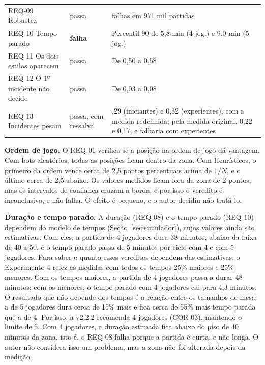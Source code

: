\begin{table}[ht]
\begin{tabularx}{\linewidth}{>{\raggedright\arraybackslash}p{3.2cm} >{\raggedright\arraybackslash}p{2.5cm} >{\raggedright\arraybackslash}X}
    REQ-09 Robustez & passa & 0 falhas em 971 mil partidas \\
    REQ-10 Tempo parado & \textbf{falha} & Percentil 90 de 5,8 min (4 jog.) e 9,0 min (5 jog.) \\
    REQ-11 Os dois estilos aparecem & passa & De 0,50 a 0,58 \\
    REQ-12 O 1º incidente não decide & passa & De 0,03 a 0,08 \\
    REQ-13 Incidentes pesam & passa, com ressalva & 0,29 (iniciantes) e 0,32 (experientes), com a medida redefinida; pela medida original, 0,22 e 0,17, e falharia com experientes \\
    \bottomrule
  \end{tabularx}
\end{table}

\textbf{Ordem de jogo.} O REQ-01 verifica se a posição na ordem de jogo dá vantagem. Com bots aleatórios, todas as
posições ficam dentro da zona. Com Heurísticos, o primeiro da ordem vence cerca de 2,5 pontos percentuais acima de
$1/N$, e o último cerca de 2,5 abaixo. Os valores medidos ficam fora da zona de 2 pontos, mas os
intervalos de confiança cruzam a borda, e por isso o veredito é inconclusivo, e não falha. O efeito é pequeno, e
o autor decidiu não tratá-lo.

\textbf{Duração e tempo parado.} A duração (REQ-08) e o tempo parado (REQ-10) dependem do modelo de tempos
(Seção~\ref{sec:simulador}), cujos valores ainda são estimativas. Com eles, a partida de 4 jogadores dura 38
minutos, abaixo da faixa de 40 a 50, e o tempo parado passa de 5 minutos por ciclo com 4 e com 5 jogadores. Para
saber o quanto esses vereditos dependem das estimativas, o Experimento 4 refez as medidas com todos os tempos 25\%
maiores e 25\% menores. Com os tempos maiores, a partida de 4 jogadores passa a durar 48 minutos; com os menores,
o tempo parado com 4 jogadores cai para 4,3 minutos. O resultado que não depende dos tempos é a relação entre os
tamanhos de mesa: a de 5 jogadores dura cerca de 15\% mais e fica cerca de 55\% mais tempo parada que a de 4. Por
isso, a v2.2.2 recomenda 4 jogadores (COR-03), mantendo o limite de 5. Com 4 jogadores, a duração
estimada fica abaixo do piso de 40 minutos da zona, isto é, o REQ-08 falha porque a partida é curta, e não longa.
O autor não considera isso um problema, mas a zona não foi alterada depois da medição.


